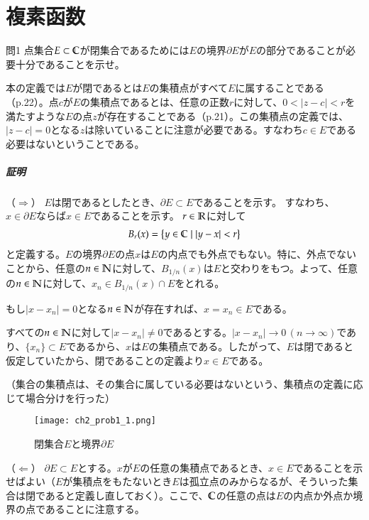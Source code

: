 \chapter{複素函数}%

\begin{mysimplebox}{問1}
    点集合$E\subset\mathbb{C}$が閉集合であるためには$E$の境界$\partial E$が$E$の部分であることが必要十分であることを示せ。 
\end{mysimplebox}

本の定義では$E$が閉であるとは$E$の集積点がすべて$E$に属することである（p.22）。点$c$が$E$の集積点であるとは、任意の正数$r$に対して、$0<|z-c|<r$を満たすような$E$の点$z$が存在することである（p.21）。この集積点の定義では、$|z-c|=0$となる$z$は除いていることに注意が必要である。すなわち$c\in E$である必要はないということである。

\paragraph{証明}
（$\Rightarrow$）
$E$は閉であるとしたとき、$\partial E\subset E$であることを示す。
すなわち、$x\in\partial E$ならば$x\in E$であることを示す。
$r\in\mathbb{R}$に対して
\begin{align*}
    B_r(x)=\left\{y\in\mathbb{C}\mid|y-x|<r\right\}
\end{align*}
と定義する。$E$の境界$\partial E$の点$x$は$E$の内点でも外点でもない。特に、外点でないことから、任意の$n\in \mathbb{N}$に対して、$B_{1/n}(x)$は$E$と交わりをもつ。よって、任意の$n\in \mathbb{N}$に対して、$x_n\in B_{1/n}(x)\cap E$をとれる。

もし$|x-x_n|=0$となる$n\in\mathbb{N}$が存在すれば、$x=x_n\in E$である。

すべての$n\in\mathbb{N}$に対して$|x-x_n|\neq 0$であるとする。$|x-x_n|\longrightarrow 0\, (n\longrightarrow \infty)$であり、$\{x_n\}\subset E$であるから、$x$は$E$の集積点である。したがって、$E$は閉であると仮定していたから、閉であることの定義より$x\in E$である。

（集合の集積点は、その集合に属している必要はないという、集積点の定義に応じて場合分けを行った）

\begin{figure}
    \centering
    \texttt{[image: ch2\_prob1\_1.png]}
    \caption{閉集合$E$と境界$\partial E$}
    \label{ch2_prob1_1}
\end{figure}%

（$\Leftarrow$）
$\partial E\subset E$とする。$x$が$E$の任意の集積点であるとき、$x\in E$であることを示せばよい（$E$が集積点をもたないとき$E$は孤立点のみからなるが、そういった集合は閉であると定義し直しておく）。ここで、$\mathbb{C}$の任意の点は$E$の内点か外点か境界の点であることに注意する。

